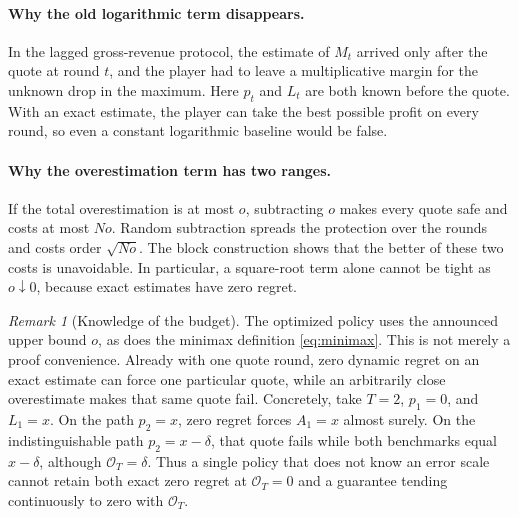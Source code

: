 \documentclass[11pt]{article}
\theoremstyle{remark}
\newtheorem{remark}[theorem]{Remark}
\newcommand{\cO}{\mathcal O}
\begin{document}
\paragraph{Why the old logarithmic term disappears.}
In the lagged gross-revenue protocol, the estimate of $M_t$ arrived only
after the quote at round $t$, and the player had to leave a multiplicative
margin for the unknown drop in the maximum.  Here $p_t$ and $L_t$ are both
known before the quote.  With an exact estimate, the player can take the
best possible profit on every round, so even a constant logarithmic baseline
would be false.

\paragraph{Why the overestimation term has two ranges.}
If the total overestimation is at most $o$, subtracting $o$ makes every quote
safe and costs at most $No$.  Random subtraction spreads the protection over
the rounds and costs order $\sqrt{No}$.  The block construction shows that
the better of these two costs is unavoidable.  In particular, a square-root
term alone cannot be tight as $o\downarrow0$, because exact estimates have
zero regret.

\begin{remark}[Knowledge of the budget]
The optimized policy uses the announced upper bound $o$, as does the
minimax definition \eqref{eq:minimax}.  This is not merely a proof
convenience.  Already with one quote round, zero dynamic regret on an exact
estimate can force one particular quote, while an arbitrarily close
overestimate makes that same quote fail.  Concretely, take $T=2$, $p_1=0$,
and $L_1=x$.  On the path $p_2=x$, zero regret forces $A_1=x$ almost surely.
On the indistinguishable path $p_2=x-\delta$, that quote fails while both
benchmarks equal $x-\delta$, although $\cO_T=\delta$.  Thus a single policy
that does not know an error scale
cannot retain both exact zero regret at $\cO_T=0$ and a guarantee tending
continuously to zero with $\cO_T$.
\end{remark}
\end{document}
